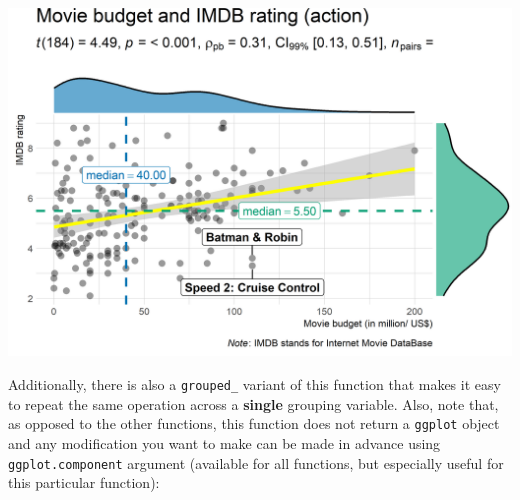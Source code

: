 \documentclass[]{article}
\begin{document}
\includegraphics[width=1\linewidth]{./figures/paper-ggscatterstats2-1}

Additionally, there is also a \texttt{grouped\_} variant of this function that makes it
easy to repeat the same operation across a \textbf{single} grouping variable. Also,
note that, as opposed to the other functions, this function does not return a
\texttt{ggplot} object and any modification you want to make can be made in advance
using \texttt{ggplot.component} argument (available for all functions, but especially
useful for this particular function):
\end{document}
